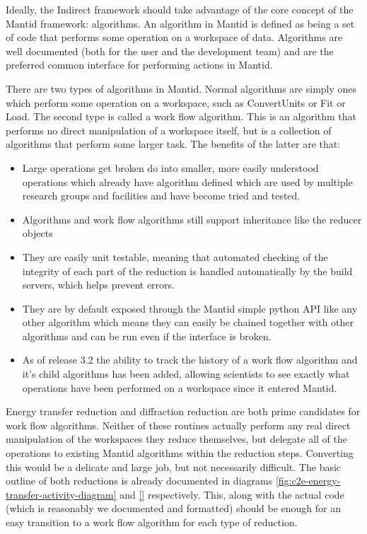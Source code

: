 \documentclass[paper=a4, fontsize=11pt]{scrartcl}	%
\numberwithin{equation}{section}															%
\numberwithin{figure}{section}																%
\numberwithin{table}{section}																%
\begin{document}
Ideally, the Indirect framework should take advantage of the core concept of the Mantid framework: algorithms. An algorithm in Mantid is defined as being a set of code that performs some operation on a workspace of data. Algorithms are well documented (both for the user and the development team) and are the preferred common interface for performing actions in Mantid.

There are two types of algorithms in Mantid. Normal algorithms are simply ones which perform some operation on a workspace, such as ConvertUnits or Fit or Load. The second type is called a work flow algorithm. This is an algorithm that performs no direct manipulation of a workspace itself, but is a collection of algorithms that perform some larger task. The benefits of the latter are that: 

\begin{itemize}
\item Large operations get broken do into smaller, more easily understood operations which already have algorithm defined which are used by multiple research groups and facilities and have become tried and tested.

\item Algorithms and work flow algorithms still support inheritance like the reducer objects

\item They are easily unit testable, meaning that automated checking of the integrity of each part of the reduction is handled automatically by the build servers, which helps prevent errors.

\item They are by default exposed through the Mantid simple python API like any other algorithm which means they can easily be chained together with other algorithms and can be run even if the interface is broken.

\item As of release 3.2 the ability to track the history of a work flow algorithm and it's child algorithms has been added, allowing scientists to see exactly what operations have been performed on a workspace since it entered Mantid.
\end{itemize}

Energy transfer reduction and diffraction reduction are both prime candidates for work flow algorithms. Neither of these routines actually perform any real direct manipulation of the workspaces they reduce themselves, but delegate all of the operations to existing Mantid algorithms within the reduction steps. Converting this would be a delicate and large job, but not necessarily difficult. The basic outline of both reductions is already documented in diagrams \ref{fig:c2e-energy-transfer-activity-diagram} and \ref{} respectively. This, along with the actual code (which is reasonably we documented and formatted) should be enough for an easy transition to a work flow algorithm for each type of reduction.
\end{document}
